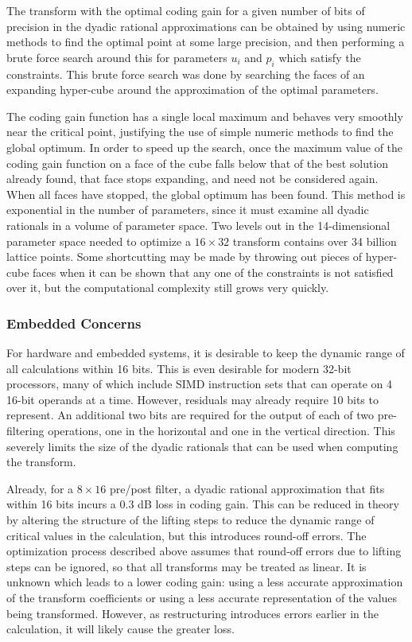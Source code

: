 \documentclass[11pt,letterpaper]{article}
\begin{document}
The transform with the optimal coding gain for a given number of bits of
 precision in the dyadic rational approximations can be obtained by using
 numeric methods to find the optimal point at some large precision, and then
 performing a brute force search around this for parameters $u_i$ and $p_i$
 which satisfy the constraints.
This brute force search was done by searching the faces of an expanding
 hyper-cube around the approximation of the optimal parameters.

The coding gain function has a single local maximum and behaves very smoothly
 near the critical point, justifying the use of simple numeric methods to find
 the global optimum.
In order to speed up the search, once the maximum value of the coding gain
 function on a face of the cube falls below that of the best solution already
 found, that face stops expanding, and need not be considered again.
When all faces have stopped, the global optimum has been found.
This method is exponential in the number of parameters, since it must examine
 all dyadic rationals in a volume of parameter space.
Two levels out in the 14-dimensional parameter space needed to optimize a
 $16\times 32$ transform contains over 34 billion lattice points.
Some shortcutting may be made by throwing out pieces of hyper-cube faces when
 it can be shown that any one of the constraints is not satisfied over it, but
 the computational complexity still grows very quickly.

\subsubsection{Embedded Concerns}

For hardware and embedded systems, it is desirable to keep the dynamic range
 of all calculations within 16 bits.
This is even desirable for modern 32-bit processors, many of which include SIMD
 instruction sets that can operate on 4 16-bit operands at a time.
However, residuals may already require 10 bits to represent.
An additional two bits are required for the output of each of two
 pre-filtering operations, one in the horizontal and one in the vertical
 direction.
This severely limits the size of the dyadic rationals that can be used when
 computing the transform.

Already, for a $8\times 16$ pre/post filter, a dyadic rational approximation
 that fits within 16 bits incurs a $0.3$ dB loss in coding gain.
This can be reduced in theory by altering the structure of the lifting steps to
 reduce the dynamic range of critical values in the calculation, but this
 introduces round-off errors.
The optimization process described above assumes that round-off errors due to
 lifting steps can be ignored, so that all transforms may be treated as linear.
It is unknown which leads to a lower coding gain: using a less accurate
 approximation of the transform coefficients or using a less accurate
 representation of the values being transformed.
However, as restructuring introduces errors earlier in the calculation, it will
 likely cause the greater loss.
\end{document}
